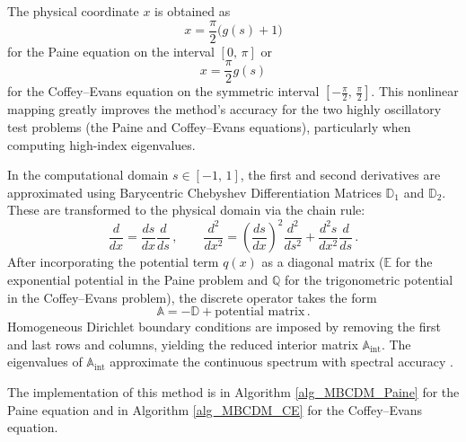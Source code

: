 \documentclass[11pt,a4paper,oneside,openright]{report} %
\begin{document}
The physical coordinate $x$ is obtained as
\begin{equation}
    x = \frac{\pi}{2} \big( g(s) + 1 \big)
\end{equation}
for the Paine equation on the interval $[0, \, \pi]$ or
\begin{equation}
    x = \frac{\pi}{2}  g(s)
\end{equation}
for the Coffey--Evans equation on the symmetric interval $[-\frac{\pi}{2}, \, \frac{\pi}{2}]$. This nonlinear mapping greatly improves the method's accuracy for the two highly oscillatory test problems (the Paine and Coffey--Evans equations), particularly when computing high-index eigenvalues.

In the computational domain $s \in [-1, \, 1]$, the first and second derivatives are approximated using Barycentric Chebyshev Differentiation Matrices $\mathbb{D}_1$ and $\mathbb{D}_2$. These are transformed to the physical domain via the chain rule:
\begin{equation}
\frac{d}{dx} = \frac{ds}{dx} \frac{d}{ds} \, , \qquad
\frac{d^2}{dx^2} = \left( \frac{ds}{dx} \right)^2 \frac{d^2}{ds^2} + \frac{d^2 s}{dx^2} \frac{d}{ds} \, .
\end{equation}
After incorporating the potential term $q(x)$ as a diagonal matrix ($\mathbb{E}$ for the exponential potential in the Paine problem and $\mathbb{Q}$ for the trigonometric potential in the Coffey--Evans problem), the discrete operator takes the form
\begin{equation}
\mathbb{A} = -\mathbb{D} + \text{potential matrix} \, .
\end{equation}
Homogeneous Dirichlet boundary conditions are imposed by removing the first and last rows and columns, yielding the reduced interior matrix $\mathbb{A}_{\text{int}}$. The eigenvalues of $\mathbb{A}_{\text{int}}$ approximate the continuous spectrum with spectral accuracy \cite{cdm}.

The implementation of this method is in Algorithm \ref{alg_MBCDM_Paine} for the Paine equation and in Algorithm \ref{alg_MBCDM_CE} for the Coffey--Evans equation.
\end{document}
